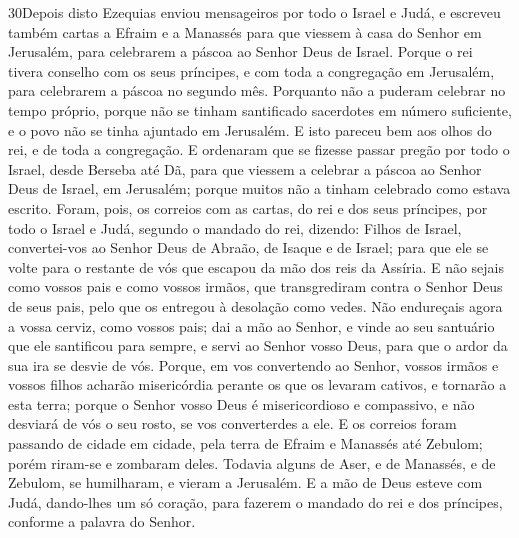 \medskip

\lettrine{30} Depois disto Ezequias enviou mensageiros por
todo o Israel e Judá, e escreveu também cartas a Efraim e a Manassés
para que viessem à casa do Senhor em Jerusalém, para celebrarem a
páscoa ao Senhor Deus de Israel. Porque o rei tivera conselho
com os seus príncipes, e com toda a congregação em Jerusalém, para
celebrarem a páscoa no segundo mês. Porquanto não a puderam
celebrar no tempo próprio, porque não se tinham santificado
sacerdotes em número suficiente, e o povo não se tinha ajuntado em
Jerusalém. E isto pareceu bem aos olhos do rei, e de toda a
congregação. E ordenaram que se fizesse passar pregão por todo o
Israel, desde Berseba até Dã, para que viessem a celebrar a páscoa
ao Senhor Deus de Israel, em Jerusalém; porque muitos não a tinham
celebrado como estava escrito. Foram, pois, os correios com as
cartas, do rei e dos seus príncipes, por todo o Israel e Judá,
segundo o mandado do rei, dizendo: Filhos de Israel, convertei-vos
ao Senhor Deus de Abraão, de Isaque e de Israel; para que ele se
volte para o restante de vós que escapou da mão dos reis da Assíria.
E não sejais como vossos pais e como vossos irmãos, que
transgrediram contra o Senhor Deus de seus pais, pelo que os
entregou à desolação como vedes. Não endureçais agora a vossa
cerviz, como vossos pais; dai a mão ao Senhor, e vinde ao seu
santuário que ele santificou para sempre, e servi ao Senhor vosso
Deus, para que o ardor da sua ira se desvie de vós. Porque, em
vos convertendo ao Senhor, vossos irmãos e vossos filhos acharão
misericórdia perante os que os levaram cativos, e tornarão a esta
terra; porque o Senhor vosso Deus é misericordioso e compassivo, e
não desviará de vós o seu rosto, se vos converterdes a ele. E
os correios foram passando de cidade em cidade, pela terra de Efraim
e Manassés até Zebulom; porém riram-se e zombaram deles.
Todavia alguns de Aser, e de Manassés, e de Zebulom, se
humilharam, e vieram a Jerusalém. E a mão de Deus esteve com
Judá, dando-lhes um só coração, para fazerem o mandado do rei e dos
príncipes, conforme a palavra do Senhor.

